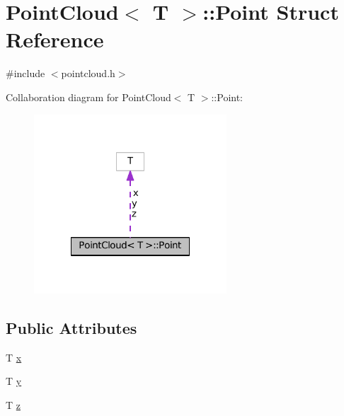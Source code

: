 \hypertarget{struct_point_cloud_1_1_point}{\section{Point\-Cloud$<$ T $>$\-:\-:Point Struct Reference}
\label{struct_point_cloud_1_1_point}
}


{\ttfamily \#include $<$pointcloud.\-h$>$}



Collaboration diagram for Point\-Cloud$<$ T $>$\-:\-:Point\-:
\nopagebreak
\begin{figure}[H]
\begin{center}
\leavevmode
\includegraphics[width=204pt]{struct_point_cloud_1_1_point__coll__graph}
\end{center}
\end{figure}
\subsection*{Public Attributes}
\begin{DoxyCompactItemize}
\item 
T \hyperlink{struct_point_cloud_1_1_point_a4c9755e331a4b3c82f69bf73573a85cb}{x}
\item 
T \hyperlink{struct_point_cloud_1_1_point_a04e6140b52712a7fcabdb3b8d06040fc}{y}
\item 
T \hyperlink{struct_point_cloud_1_1_point_a606a44d077bc9f483cf6ff58c4896a14}{z}
\end{DoxyCompactItemize}


